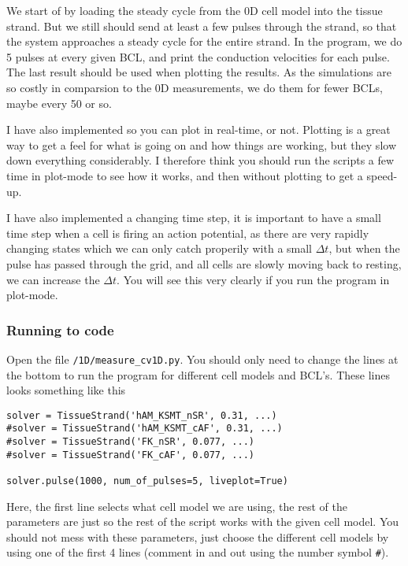 \documentclass[a4paper, 11pt, notitlepage, english]{article}
\begin{document}
We start of by loading the steady cycle from the 0D cell model into the tissue strand. But we still should send at least a few pulses through the strand, so that the system approaches a steady cycle for the entire strand. In the program, we do 5 pulses at every given BCL, and print the conduction velocities for each pulse. The last result should be used when plotting the results. As the simulations are so costly in comparsion to the 0D measurements, we do them for fewer BCLs, maybe every 50 or so.

I have also implemented so you can plot in real-time, or not. Plotting is a great way to get a feel for what is going on and how things are working, but they slow down everything considerably. I therefore think you should run the scripts a few time in plot-mode to see how it works, and then without plotting to get a speed-up.

I have also implemented a changing time step, it is important to have a small time step when a cell is firing an action potential, as there are very rapidly changing states which we can only catch properily with a small $\Delta t$, but when the pulse has passed through the grid, and all cells are slowly moving back to resting, we can increase the $\Delta t$. You will see this very clearly if you run the program in plot-mode.

\subsubsection*{Running to code}

Open the file \verb!/1D/measure_cv1D.py!. You should only need to change the lines at the bottom to run the program for different cell models and BCL's. These lines looks something like this
\begin{lstlisting}
solver = TissueStrand('hAM_KSMT_nSR', 0.31, ...)
#solver = TissueStrand('hAM_KSMT_cAF', 0.31, ...)
#solver = TissueStrand('FK_nSR', 0.077, ...)
#solver = TissueStrand('FK_cAF', 0.077, ...)

solver.pulse(1000, num_of_pulses=5, liveplot=True)
\end{lstlisting}

Here, the first line selects what cell model we are using, the rest of the parameters are just so the rest of the script works with the given cell model. You should not mess with these parameters, just choose the different cell models by using one of the first 4 lines (comment in and out using the number symbol \verb+#+).
\end{document}
